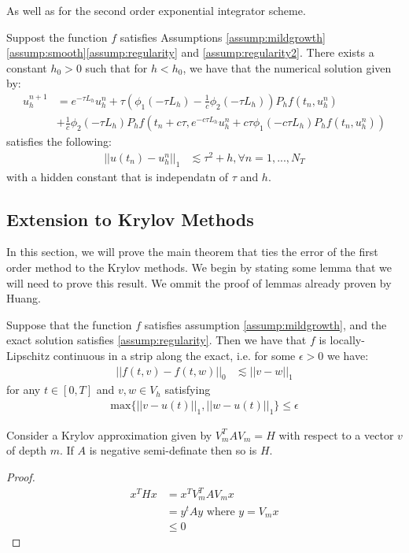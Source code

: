 As well as for the second order exponential integrator scheme.
\begin{theorem}\label{theorem:standard2}
    Suppost the function $f$ satisfies Assumptions \ref{assump:mildgrowth}\ref{assump:smooth}\ref{assump:regularity} and \ref{assump:regularity2}.
    There exists a constant $h_0 > 0$ such that for $h<h_0$, we have that the numerical solution given by:
    \begin{align*}
        u_h^{n+1} &= e^{-\tau L_h}u_h^n + \tau (\phi_1(-\tau L_h) - \frac{1}{c}\phi_2(-\tau L_h))P_hf(t_n,u_h^n)\\
        &+\frac{1}{c}\phi_2(-\tau L_h)P_hf(t_n + c\tau,e^{-c\tau L_h}u_h^n + c\tau\phi_1(-c\tau L_h)P_hf(t_n,u_h^n))
    \end{align*}
    satisfies the following:
    \begin{align*}
        ||u(t_n) - u_h^n||_1 &\lesssim \tau^2 + h, \forall n =1,...,N_T
    \end{align*}
    with a hidden constant that is independatn of $\tau$ and $h$.
\end{theorem}

\subsection{Extension to Krylov Methods}

In this section, we will prove the main theorem that ties the error of the first order method to the Krylov methods.
We begin by stating some lemma that we will need to prove this result.
We ommit the proof of lemmas already proven by Huang\cite{Huang2022}.

\begin{lemma} \label{lemma:Lipschitz}
    Suppose that the function $f$ satisfies assumption \ref{assump:mildgrowth}, and the exact solution satisfies \ref{assump:regularity}.
    Then we have that $f$ is locally-Lipschitz continuous in a strip along the exact, i.e. for some $\epsilon > 0$ we have:
    \begin{align*}
        ||f(t,v) - f(t,w)||_0 &\lesssim ||v-w||_1
    \end{align*}
    for any $t\in [0,T]$ and $v,w \in V_h$ satisfying
    \begin{align*}
        \text{max}\{||v-u(t)||_1,||w-u(t)||_1\}\leq \epsilon
    \end{align*}
\end{lemma}

\begin{lemma}
    Consider a Krylov approximation given by $V_m^TAV_m = H$ with respect to a vector $v$ of depth $m$.
    If $A$ is negative semi-definate then so is $H$.
\end{lemma}
\begin{proof}
    \begin{align*}
        x^T Hx &= x^T V_m^TAV_mx\\
        &= y^tAy \text{ where $y = V_mx$}\\
        &\leq 0
    \end{align*}
\end{proof}


